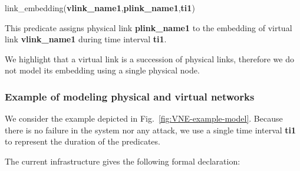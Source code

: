 \begin{myformula}
link\_embedding(\textbf{vlink\_name1},\textbf{plink\_name1},\textbf{ti1})
\end{myformula}

This predicate assigns physical link \textbf{plink\_name1} to the embedding of virtual link \textbf{vlink\_name1} during time interval \textbf{ti1}.

We highlight that a virtual link is a succession of physical links, therefore we do not model its embedding using a single physical node.


\subsubsection{Example of modeling physical and virtual networks}

We consider the example depicted in Fig.~\ref{fig:VNE-example-model}.
Because there is no failure in the system nor any attack, we use a single time interval \textbf{ti1} to represent the duration of the predicates.



The current infrastructure gives the following formal declaration:

